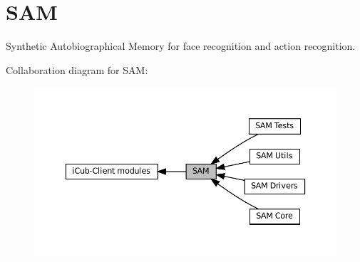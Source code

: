 \hypertarget{group__icubclient__SAM__source}{}\section{S\+AM}
\label{group__icubclient__SAM__source}


Synthetic Autobiographical Memory for face recognition and action recognition.  


Collaboration diagram for S\+AM\+:
\nopagebreak
\begin{figure}[H]
\begin{center}
\leavevmode
\includegraphics[width=350pt]{group__icubclient__SAM__source}
\end{center}
\end{figure}
